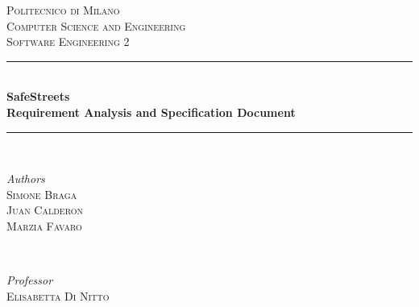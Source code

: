 \documentclass[a4paper]{article}
\begin{document}

\begin{titlepage}
	\newcommand{\HRule}{\rule{\linewidth}{0.5mm}}
	
	\center
	
	
	\textsc{\LARGE Politecnico di Milano}\\[1.5cm]
	
	\textsc{\Large Computer Science and Engineering}\\[0.5cm]
	
	\textsc{\large Software Engineering 2}\\[0.5cm]
	
	
	\HRule\\[0.4cm]
	
	{\huge\bfseries SafeStreets\medskip\\
	\normalsize Requirement Analysis and Specification Document}\\[0.4cm]
	
	\HRule\\[1.5cm]
	
	
	\begin{minipage}{0.4\textwidth}
		\begin{flushleft}
			\large
			\textit{Authors}\\
			\textsc{Simone Braga}\\
			\textsc{Juan Calderon}\\
			\textsc{Marzia Favaro}
		\end{flushleft}
	\end{minipage}
	~
	\begin{minipage}{0.4\textwidth}
		\begin{flushright}
			\large
			\textit{Professor}\\
			\textsc{Elisabetta Di Nitto}\linebreak\linebreak
		\end{flushright}
	\end{minipage}
	

\end{titlepage}
\end{document}
